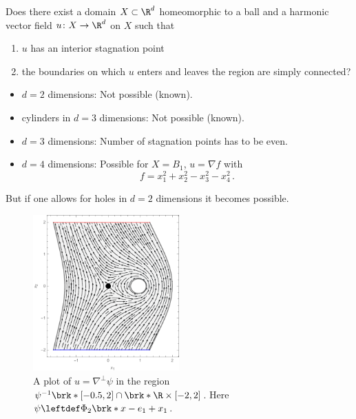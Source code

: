 \begin{frame}
  \begin{question} \label{qu:flowthroughStagnationPoint}
    Does there exist a domain $X\subset\R^d$ homeomorphic to a ball and a harmonic vector field $u\colon X\to\R^d$ on $X$ such that
    \begin{enumerate}
      \item $u$ has an interior stagnation point
      \item the boundaries on which $u$ enters and leaves the region are simply connected?
    \end{enumerate}
  \end{question}
  \begin{answer}
  \begin{itemize}
    \item $d=2$ dimensions: Not possible (known).
    \item cylinders in $d=3$ dimensions: Not possible (known).
    \item $d=3$ dimensions: Number of stagnation points has to be even.
    \item $d=4$ dimensions: Possible for $X=B_1$, $u=\nabla f$ with $$f=x_1^2+x_2^2-x_3^2-x_4^2\,.$$
  \end{itemize}
\end{answer}
\end{frame}

\begin{frame}
  But if one allows for holes in $d=2$ dimensions it becomes possible.
  \begin{figure}
    \centering
    \includegraphics[width=0.5\textwidth]{../Plots/n2_hvf_InflowOutflow_asymmetric_gray_2.pdf}
    \caption{A plot of $u=\nabla^\perp\psi$ in the region $\psi^{-1}\brk*{[-0.5,2]}\cap \brk*{\R\times[-2,2]}$.
    Here $\psi\leftdef\Phi_2\brk*{x-e_1}+x_1$.}
    \label{pl:n2_hvf_InflowOutflow_asymmetric_single}
  \end{figure}
\end{frame}

